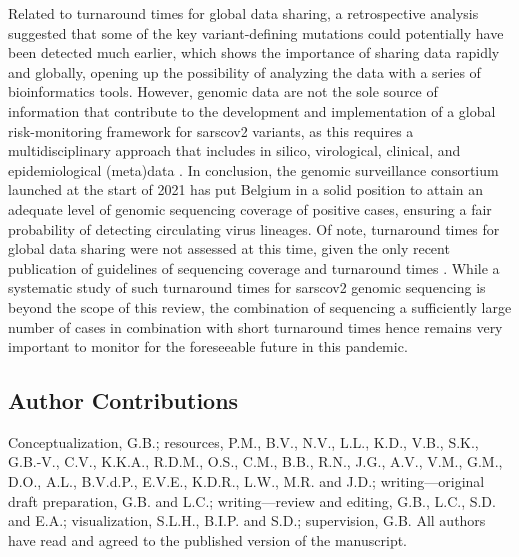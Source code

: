 Related to turnaround times for global data sharing, a retrospective analysis \citep{maher2022predicting} suggested that some of the key variant-defining mutations could potentially have been detected much earlier, which shows the importance of sharing data rapidly and globally, opening up the possibility of analyzing the data with a series of bioinformatics tools.
However, genomic data are not the sole source of information that contribute to the development and implementation of a global risk-monitoring framework for \gls{sarscov2} variants, as this requires a multidisciplinary approach that includes in silico, virological, clinical, and epidemiological (meta)data \citep{subissi2022early}.
In conclusion, the genomic surveillance consortium launched at the start of 2021 has put Belgium in a solid position to attain an adequate level of genomic sequencing coverage of positive cases, ensuring a fair probability of detecting circulating virus lineages.
Of note, turnaround times for global data sharing were not assessed at this time, given the only recent publication of guidelines of sequencing coverage and turnaround times \citep{brito2022global}.
While a systematic study of such turnaround times for \gls{sarscov2} genomic sequencing is beyond the scope of this review, the combination of sequencing a sufficiently large number of cases in combination with short turnaround times hence remains very important to monitor for the foreseeable future in this pandemic.

\subsection*{Author Contributions}
Conceptualization, G.B.; resources, P.M., B.V., N.V., L.L., K.D., V.B., S.K., G.B.-V., C.V., K.K.A., R.D.M., O.S., C.M., B.B., R.N., J.G., A.V., V.M., G.M., D.O., A.L., B.V.d.P., E.V.E., K.D.R., L.W., M.R. and J.D.; writing—original draft preparation, G.B. and L.C.; writing—review and editing, G.B., L.C., S.D. and E.A.; visualization, S.L.H., B.I.P. and S.D.; supervision, G.B.
All authors have read and agreed to the published version of the manuscript.

